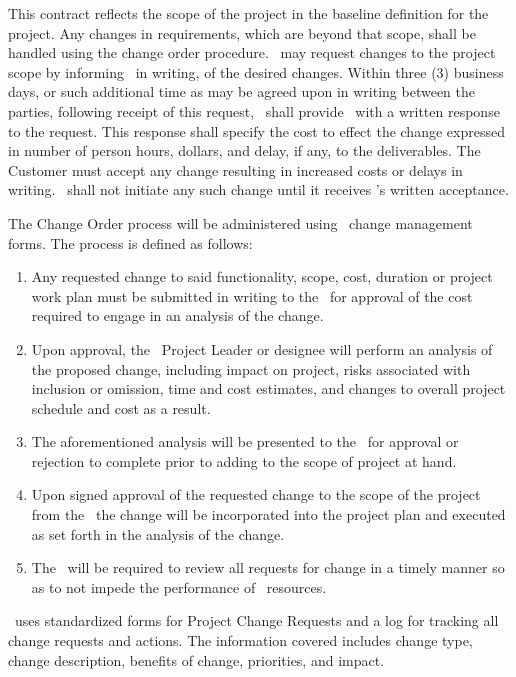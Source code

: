 \documentclass[a4paper,10pt,notitlepage,twocolumn]{article}
\begin{document}
\bigskip
This contract reflects the scope of the project in the baseline definition for the project.  Any changes in requirements, which are beyond that scope, shall be handled using the change order procedure.  \clref\ may request changes to the project scope by informing \cntrref\, in writing, of the desired changes.  Within three (3) business days, or such additional time as may be agreed upon in writing between the parties, following receipt of this request, \cntrref\ shall provide \clref\ with a written response to the request.  This response shall specify the cost to effect the change expressed in number of person hours, dollars, and delay, if any, to the deliverables.  The Customer  must accept any change resulting in increased costs or delays in writing.  \cntrref\ shall not initiate any such change until it receives \clref 's written acceptance.


The Change Order process will be administered using \cntrref\ change management forms.  The process is defined as follows:
\begin{enumerate}
\item Any requested change to said functionality, scope, cost, duration or project work plan must be submitted in writing to the \cntrref\  for approval of the cost required to engage in an 
analysis of the change.

\item Upon approval, the \cntrref\ Project Leader or designee will perform an analysis of the proposed change, including impact on project, risks associated with inclusion or omission, time and cost estimates, and changes to overall project schedule and cost as a result.

\item The aforementioned analysis will be presented to the \clref\ for approval or rejection to complete prior to adding to the scope of project at hand.

\item Upon signed approval of the requested change to the scope of the project from the \clref\, the change will be incorporated into the project plan and executed as set forth in the analysis of the change.

\item The \clref\ will be required to review all requests for change in a timely manner so as to not impede the performance of \cntrref\ resources.

\end{enumerate}




\cntrref\ uses standardized forms for Project Change Requests and a log for tracking all change requests and actions. The information covered includes change type, change description, benefits of change, priorities, and impact. 
\end{document}
